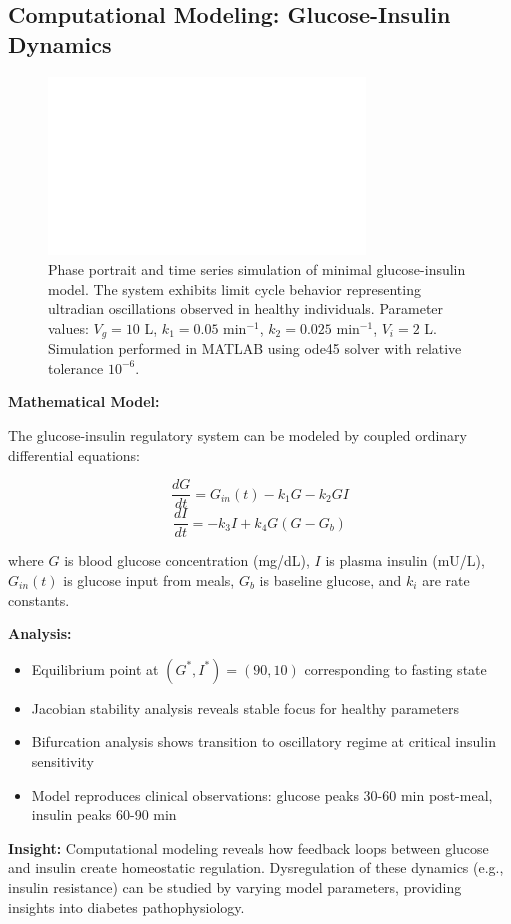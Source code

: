 
\subsection*{Computational Modeling: Glucose-Insulin Dynamics}

\begin{figure}[h]
\centering
\includegraphics[width=0.75\textwidth]{assets/placeholder_1600x900.png}
\caption{Phase portrait and time series simulation of minimal glucose-insulin model. The system exhibits limit cycle behavior representing ultradian oscillations observed in healthy individuals. Parameter values: $V_g = 10$ L, $k_1 = 0.05$ min$^{-1}$, $k_2 = 0.025$ min$^{-1}$, $V_i = 2$ L. Simulation performed in MATLAB using ode45 solver with relative tolerance $10^{-6}$.}
\end{figure}

\textbf{Mathematical Model:}

The glucose-insulin regulatory system can be modeled by coupled ordinary differential equations:

\[
\frac{dG}{dt} = G_{in}(t) - k_1 G - k_2 G I
\]
\[
\frac{dI}{dt} = -k_3 I + k_4 G (G - G_b)
\]

where $G$ is blood glucose concentration (mg/dL), $I$ is plasma insulin (mU/L), $G_{in}(t)$ is glucose input from meals, $G_b$ is baseline glucose, and $k_i$ are rate constants.

\textbf{Analysis:}
\begin{itemize}[leftmargin=1.2em, itemsep=0.1em]
  \item Equilibrium point at $(G^*, I^*) = (90, 10)$ corresponding to fasting state
  \item Jacobian stability analysis reveals stable focus for healthy parameters
  \item Bifurcation analysis shows transition to oscillatory regime at critical insulin sensitivity
  \item Model reproduces clinical observations: glucose peaks 30-60 min post-meal, insulin peaks 60-90 min
\end{itemize}

\textbf{Insight:} Computational modeling reveals how feedback loops between glucose and insulin create homeostatic regulation. Dysregulation of these dynamics (e.g., insulin resistance) can be studied by varying model parameters, providing insights into diabetes pathophysiology.


